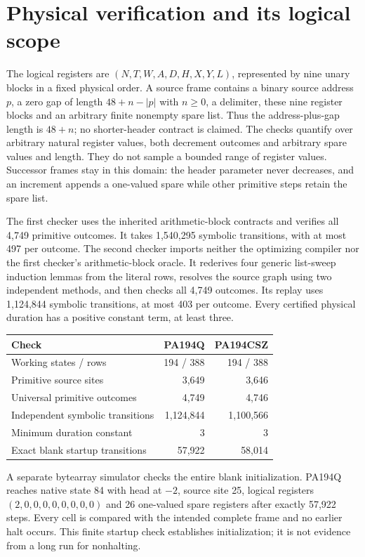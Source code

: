 \documentclass[11pt,letterpaper]{article}
\begin{document}
\section{Physical verification and its logical scope}

The logical registers are $(N,T,W,A,D,H,X,Y,L)$, represented by nine
unary blocks in a fixed physical order. A source frame contains a binary
source address $p$, a zero gap of length $48+n-|p|$ with $n\ge0$, a
delimiter, these nine register blocks and an arbitrary finite nonempty
spare list. Thus the address-plus-gap length is $48+n$; no shorter-header
contract is claimed. The checks quantify
over arbitrary natural register values, both decrement outcomes and
arbitrary spare values and length. They do not sample a bounded range of
register values. Successor frames stay in this domain: the header
parameter never decreases, and an increment appends a one-valued spare
while other primitive steps retain the spare list.

The first checker uses the inherited arithmetic-block contracts and
verifies all 4,749 primitive outcomes. It takes 1,540,295 symbolic
transitions, with at most 497 per outcome. The second checker imports
neither the optimizing compiler nor the first checker's arithmetic-block
oracle. It rederives four generic list-sweep induction lemmas from the
literal rows, resolves the source graph using two independent methods,
and then checks all 4,749 outcomes. Its replay uses 1,124,844 symbolic
transitions, at most 403 per outcome. Every certified physical duration
has a positive constant term, at least three.

\begin{center}
\begin{tabular}{@{}lrr@{}}
\toprule
Check & PA194Q & PA194CSZ\\\midrule
Working states / rows &194 / 388&194 / 388\\
Primitive source sites &3,649&3,646\\
Universal primitive outcomes &4,749&4,746\\
Independent symbolic transitions &1,124,844&1,100,566\\
Minimum duration constant &3&3\\
Exact blank startup transitions &57,922&58,014\\
\bottomrule
\end{tabular}
\end{center}

A separate bytearray simulator checks the entire blank initialization.
PA194Q reaches native state 84 with head at $-2$, source site 25, logical
registers $(2,0,0,0,0,0,0,0,0)$ and 26 one-valued spare registers after
exactly 57,922 steps. Every cell is compared with the intended complete
frame and no earlier halt occurs. This finite startup check establishes
initialization; it is not evidence from a long run for nonhalting.
\end{document}
